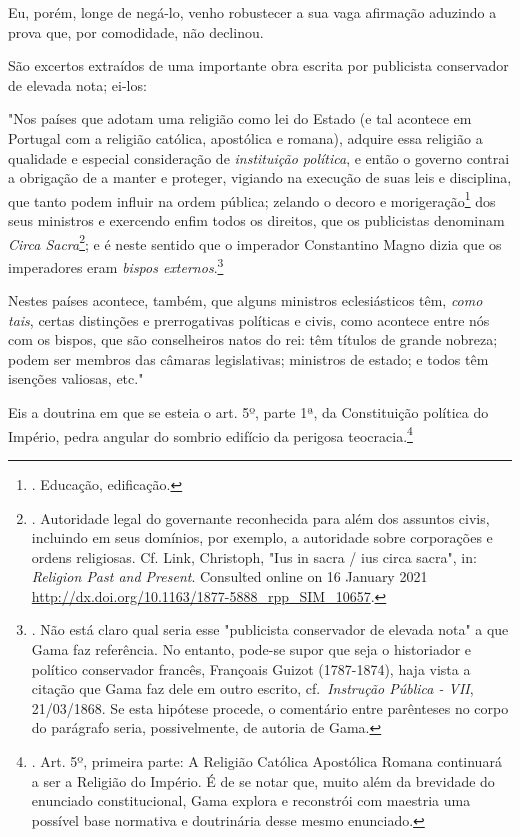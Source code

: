 Eu, porém, longe de negá-lo, venho robustecer a sua vaga afirmação
aduzindo a prova que, por comodidade, não declinou.

São excertos extraídos de uma importante obra escrita por publicista
conservador de elevada nota; ei-los:

"Nos países que adotam uma religião como lei do Estado (e tal acontece
em Portugal com a religião católica, apostólica e romana), adquire essa
religião a qualidade e especial consideração de \emph{instituição
política}, e então o governo contrai a obrigação de a manter e proteger,
vigiando na execução de suas leis e disciplina, que tanto podem influir
na ordem pública; zelando o decoro e morigeração\footnote{. Educação,
  edificação.} dos seus ministros e exercendo enfim todos os direitos,
que os publicistas denominam \emph{Circa Sacra}\footnote{. Autoridade
  legal do governante reconhecida para além dos assuntos civis,
  incluindo em seus domínios, por exemplo, a autoridade sobre
  corporações e ordens religiosas. Cf. Link, Christoph, "Ius in sacra /
  ius circa sacra", in: \emph{Religion Past and Present}. Consulted
  online on 16 January 2021
  \url{http://dx.doi.org/10.1163/1877-5888_rpp_SIM_10657}.}; e é neste
sentido que o imperador Constantino Magno dizia que os imperadores eram
\emph{bispos externos}.\footnote{. Não está claro qual seria esse
  "publicista conservador de elevada nota" a que Gama faz referência. No
  entanto, pode-se supor que seja o historiador e político conservador
  francês, Françoais Guizot (1787-1874), haja vista a citação que Gama
  faz dele em outro escrito, cf.~\emph{Instrução Pública - VII},
  21/03/1868. Se esta hipótese procede, o comentário entre parênteses no
  corpo do parágrafo seria, possivelmente, de autoria de Gama.}

Nestes países acontece, também, que alguns ministros eclesiásticos têm,
\emph{como tais}, certas distinções e prerrogativas políticas e civis,
como acontece entre nós com os bispos, que são conselheiros natos do
rei: têm títulos de grande nobreza; podem ser membros das câmaras
legislativas; ministros de estado; e todos têm isenções valiosas, etc."

Eis a doutrina em que se esteia o art. 5º, parte 1ª, da Constituição
política do Império, pedra angular do sombrio edifício da perigosa
teocracia.\footnote{. Art. 5º, primeira parte: A Religião Católica
  Apostólica Romana continuará a ser a Religião do Império. É de se
  notar que, muito além da brevidade do enunciado constitucional, Gama
  explora e reconstrói com maestria uma possível base normativa e
  doutrinária desse mesmo enunciado.}

